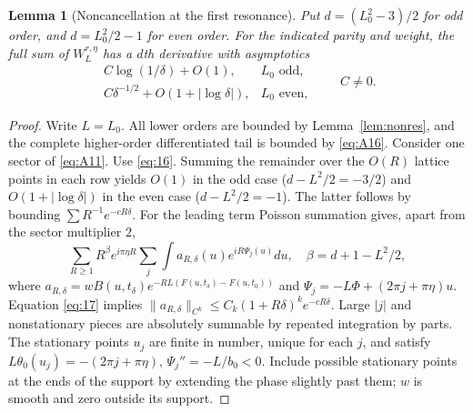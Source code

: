 \documentclass[11pt,a4paper]{article}
\numberwithin{equation}{section}
\theoremstyle{plain}
\newtheorem{lemma}[theorem]{Lemma}
\theoremstyle{definition}
\begin{document}
\begin{lemma}[Noncancellation at the first resonance]\label{lem:first}
Put $d=(L_0^2-3)/2$ for odd order, and $d=L_0^2/2-1$ for even order. For the indicated parity and weight, the full sum of $W_L^{r,\eta}$ has a $d$th derivative with asymptotics
\begin{equation}
\begin{array}{ll}
 C\log(1/\delta)+O(1),&L_0\text{ odd},\\
 C\delta^{-1/2}+O(1+|\log\delta|),&L_0\text{ even},
\end{array}\qquad C\ne0.\label{eq:A19}
\end{equation}
\end{lemma}
\begin{proof}
Write $L=L_0$. All lower orders are bounded by Lemma~\ref{lem:nonres}, and the complete higher-order differentiated tail is bounded by \eqref{eq:A16}. Consider one sector of \eqref{eq:A11}. Use \eqref{eq:16}. Summing the remainder over the $O(R)$ lattice points in each row yields $O(1)$ in the odd case ($d-L^2/2=-3/2$) and $O(1+|\log\delta|)$ in the even case ($d-L^2/2=-1$). The latter follows by bounding $\sum R^{-1}e^{-cR\delta}$. For the leading term Poisson summation gives, apart from the sector multiplier $2$,
\[
\sum_{R\ge1} R^{\beta}e^{i\pi\eta R}\sum_j\int a_{R,\delta}(u)e^{iR\Psi_j(u)}du,
\quad \beta=d+1-L^2/2,
\]
where $a_{R,\delta}=wB(u,t_\delta)e^{-RL(F(u,t_\delta)-F(u,t_0))}$ and $\Psi_j=-L\Phi+(2\pi j+\pi\eta)u$. Equation \eqref{eq:17} implies $\|a_{R,\delta}\|_{C^k}\le C_k(1+R\delta)^k e^{-cR\delta}$. Large $|j|$ and nonstationary pieces are absolutely summable by repeated integration by parts. The stationary points $u_j$ are finite in number, unique for each $j$, and satisfy $L\theta_0(u_j)=-(2\pi j+\pi\eta)$, $\Psi_j''=-L/b_0<0$. Include possible stationary points at the ends of the support by extending the phase slightly past them; $w$ is smooth and zero outside its support.


\end{proof}
\end{document}
